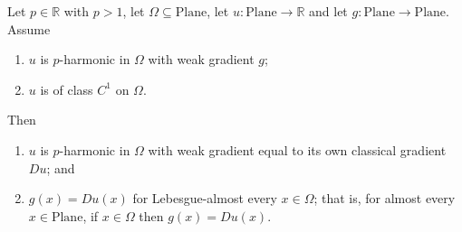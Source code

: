 \begin{lemma}
Let $p\in\mathbb{R}$ with $p>1$, let $\Omega\subseteq\mathrm{Plane}$, let
$u\colon\mathrm{Plane}\to\mathbb{R}$ and let $g\colon\mathrm{Plane}\to\mathrm{Plane}$.  Assume
\begin{enumerate}
\item $u$ is $p$-harmonic in $\Omega$ with weak gradient $g$;
\item $u$ is of class $C^{1}$ on $\Omega$.
\end{enumerate}
Then
\begin{enumerate}
\item[(a)] $u$ is $p$-harmonic in $\Omega$ with weak gradient equal to its own classical
gradient $Du$; and
\item[(b)] $g(x)=Du(x)$ for Lebesgue-almost every $x\in\Omega$; that is, for almost every
$x\in\mathrm{Plane}$, if $x\in\Omega$ then $g(x)=Du(x)$.
\end{enumerate}
\end{lemma}
